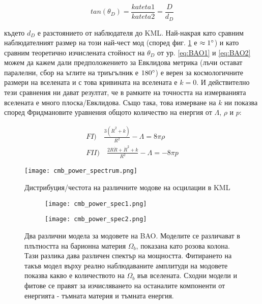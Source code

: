 \documentclass[a4paper,12pt]{article}
\begin{document}
\begin{equation}
    tan(\theta_D) = \frac{kateta1}{kateta2} = \frac{D}{d_D}
\label{eq:BAO2}
\end{equation}

където $d_D$ е разстоянието от наблюдателя до KML. Най-накрая като сравним наблюдателният размер на този най-чест мод (според фиг. \ref{fig:cmb_power_spectrum} е $\approx 1 \degree$) и като сравним теоретично изчислената стойност на $\theta_D$ от ур. \eqref{eq:BAO1} и \eqref{eq:BAO2} можем да кажем дали предположението за Евклидова метрика (лъчи остават паралелни, сбор на ъглите на триъгълник е $180 \degree$) е верен за космологичните размери на вселената и с това кривината на вселената е $k=0$. И действително тези сравнения ни дават резултат, че в рамките на точността на измерванията вселената е много плоска/Евклидова. Също така, това измерване на $k$ ни показва според Фридмановите уравнения общото количество на енергия от $\Lambda$, $\rho$ и $p$:


\begin{gather}
    FI) \quad \frac{3(\dot{R}^2 + k)} {R^2} - \Lambda = 8\pi \rho\\
    FII) \quad \frac{2R\ddot{R} + \dot{R}^2 + k}{R^2} - \Lambda = -8\pi p
\end{gather}


\begin{figure}[h!] %
\centering
\texttt{[image: cmb\_power\_spectrum.png]}
\caption{Дистрибуция/честота на различните модове на осцилации в KML}
\label{fig:cmb_power_spectrum}
\end{figure}



\begin{figure}
\centering
\begin{subfigure}{.5\textwidth}
  \centering
  \texttt{[image: cmb\_power\_spec1.png]}
  \label{fig:sub1}
\end{subfigure}%
\begin{subfigure}{.5\textwidth}
  \centering
  \texttt{[image: cmb\_power\_spec2.png]}
  \label{fig:sub2}
\end{subfigure}
\caption{Два различни модела за модовете на BAO. Моделите се различават в плътността на барионна материя $\Omega_b$, показана като розова колона. Тази разлика дава различен спектър на мощността. Фитирането на такъв модел върху реално наблюдаваните амплитуди на модовете показва какво е количеството на $\Omega_b$ във вселената. Сходни модели и фитове се правят за изчисляването на останалите компоненти от енергията - тъмната материя и тъмната енергия.}
\label{fig:cmb_models}
\end{figure}
\end{document}
